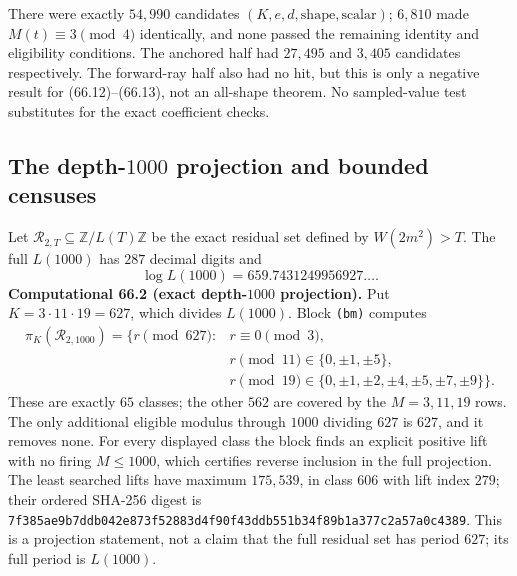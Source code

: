 \documentclass[10pt,reqno]{amsart}
\theoremstyle{definition}
\newcommand{\1}{\mathbf 1}
\begin{document}
There were exactly $54{,}990$ candidates
$(K,e,d,\text{shape},\text{scalar})$; $6{,}810$ made
$M(t)\equiv3\pmod4$ identically, and none passed the remaining identity and
eligibility conditions.  The anchored half had $27{,}495$ and $3{,}405$
candidates respectively.  The forward-ray half also had no hit, but this is
only a negative result for (66.12)--(66.13), not an all-shape theorem.  No
sampled-value test substitutes for the exact coefficient checks.

\subsection{The depth-$1000$ projection and bounded censuses}
Let $\mathcal R_{2,T}\subseteq\mathbb Z/L(T)\mathbb Z$ be the exact residual
set defined by $W(2m^2)>T$.  The full $L(1000)$ has $287$ decimal digits and
\begin{equation}\tag{66.15}
                         \log L(1000)=659.7431249956927\ldots.
\end{equation}
\medskip\noindent\textbf{Computational 66.2 (exact depth-$1000$ projection).}
Put $K=3\cdot11\cdot19=627$, which divides $L(1000)$.  Block
\texttt{(bm)} computes
\begin{equation}\tag{66.16}
 \begin{split}
 \pi_K(\mathcal R_{2,1000})=\{r\pmod {627}:{}&r\equiv0\pmod3,\\
 &r\pmod {11}\in\{0,\mathord\pm1,\mathord\pm5\},\\
 &r\pmod {19}\in
 \{0,\mathord\pm1,\mathord\pm2,\mathord\pm4,
            \mathord\pm5,\mathord\pm7,\mathord\pm9\}\}.
 \end{split}
\end{equation}
These are exactly $65$ classes; the other $562$ are covered by the
$M=3,11,19$ rows.  The only additional eligible modulus through $1000$
dividing $627$ is $627$, and it removes none.  For every displayed class
the block finds an explicit positive lift with no firing $M\leq1000$, which
certifies reverse inclusion in the full projection.  The least searched
lifts have maximum $175{,}539$, in class $606$ with lift index $279$; their
ordered SHA-256 digest is
\texttt{7f385ae9b7ddb042e873f52883d4f90f43ddb551b34f89b1a377c2a57a0c4389}.
This is a projection statement, not a claim that the full residual set has
period $627$; its full period is $L(1000)$.
\end{document}
